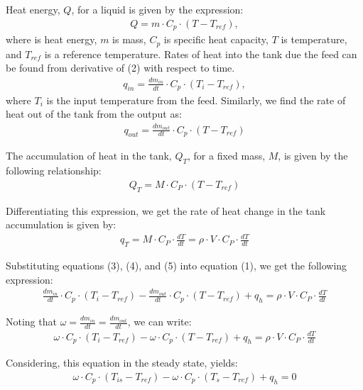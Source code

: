\documentclass{article}
\begin{document}
Heat energy, $Q$, for a liquid is given by the expression:
\begin{align}
Q = m \cdot C_p \cdot (T - T_{ref}),
\end{align}
where is heat energy, $m$ is mass, $C_p$ is specific heat capacity, $T$ is temperature, and $T_{ref}$ is a reference temperature. Rates of heat into the tank due the feed can be found from derivative of (2) with respect to time.
\begin{align}
q_{in} = \frac{dm_{in}}{dt} \cdot C_p \cdot (T_i - T_{ref}),
\end{align}
where $T_i$ is the input temperature from the feed. Similarly, we find the rate of heat out of the tank from the output as:
\begin{align}
q_{out} = \frac{dm_{out}}{dt} \cdot C_p \cdot (T - T_{ref})
\end{align}

The accumulation of heat in the tank, $Q_T$, for a fixed mass, $M$, is given by the following relationship:
\begin{align*}
Q_{T} = M \cdot C_P \cdot (T - T_{ref})
\end{align*}

Differentiating this expression, we get the rate of heat change in the tank accumulation is given by:
\begin{align}
q_{T} = M \cdot C_P \cdot \frac{dT}{dt} = \rho \cdot V \cdot C_P \cdot \frac{dT}{dt}
\end{align}

Substituting equations (3), (4), and (5) into equation (1), we get the following expression:
\begin{align*}
\frac{dm_{in}}{dt} \cdot C_p \cdot (T_i - T_{ref}) - \frac{dm_{out}}{dt} \cdot C_p \cdot (T - T_{ref}) + q_h = \rho \cdot V \cdot C_P \cdot \frac{dT}{dt}
\end{align*}

Noting that $\omega = \frac{dm_{in}}{dt} = \frac{dm_{out}}{dt}$, we can write:
\begin{align}
\omega \cdot C_p \cdot (T_i - T_{ref}) - \omega \cdot C_p \cdot (T - T_{ref}) + q_h = \rho \cdot V \cdot C_P \cdot \frac{dT}{dt}
\end{align}

Considering, this equation in the steady state, yields:
\begin{align}
\omega \cdot C_p \cdot (T_{is} - T_{ref}) - \omega \cdot C_p \cdot (T_s - T_{ref}) + q_h = 0
\end{align}
\end{document}
